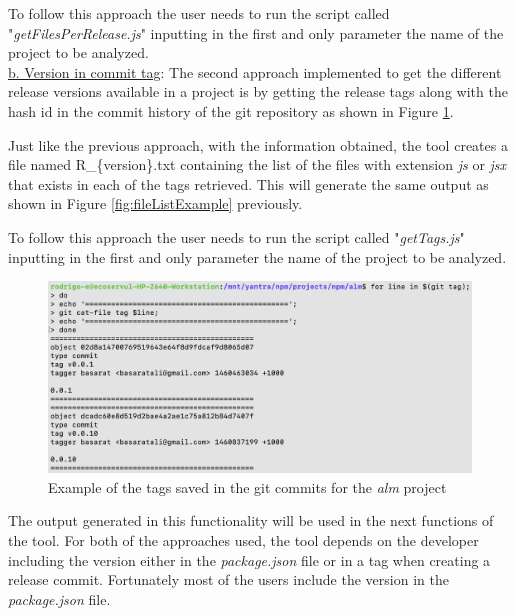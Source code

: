 To follow this approach the user needs to run the script called "\textit{getFilesPerRelease.js}" inputting in the first and only parameter the name of the project to be analyzed. \\

\underline{b. Version in commit tag}:
The second approach implemented to get the different release versions available in a project is by getting the release tags along with the hash id in the commit history of the git repository as shown in Figure \ref{fig:tagExample}.

Just like the previous approach, with the information obtained, the tool creates a file named R\_\{version\}.txt containing the list of the files with extension \textit{js} or \textit{jsx} that exists in each of the tags retrieved. 
This will generate the same output as shown in Figure \ref{fig:fileListExample} previously.

To follow this approach the user needs to run the script called "\textit{getTags.js}" inputting in the first and only parameter the name of the project to be analyzed. 

\begin{figure}[ht!]
\centering
\includegraphics[width=1\textwidth]{images/tag_example2.png}
\caption{Example of the tags saved in the git commits for the \textit{alm} project}
\label{fig:tagExample}
\end{figure}

The output generated in this functionality will be used in the next functions of the tool. For both of the approaches used, the tool depends on the developer including the version either in the \textit{package.json} file or in a tag when creating a release commit. Fortunately most of the users include the version in the \textit{package.json} file.\\

